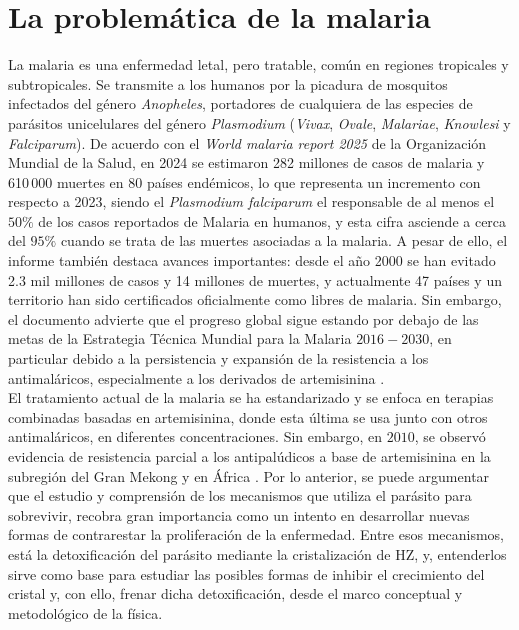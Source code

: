 \documentclass[12pt,letterpaper,oneside]{report}
\begin{document}
\chapter{La problemática de la malaria}

La malaria es una enfermedad letal, pero tratable, común en regiones tropicales y subtropicales. Se transmite a los humanos por la picadura de mosquitos infectados del género \textit{Anopheles}, portadores de cualquiera de las especies de parásitos unicelulares del género \textit{Plasmodium} (\textit{Vivax}, \textit{Ovale}, \textit{Malariae}, \textit{Knowlesi} y \textit{Falciparum}). De acuerdo con el \textit{World malaria report 2025} de la Organización Mundial de la Salud, en 2024 se estimaron 282 millones de casos de malaria y 610\,000 muertes en 80 países endémicos, lo que representa un incremento con respecto a 2023, siendo el \textit{Plasmodium falciparum} el responsable de al menos el $50 \%$ de los casos reportados de Malaria en humanos, y esta cifra asciende a cerca del $95 \%$ cuando se trata de las muertes asociadas a la malaria. A pesar de ello, el informe también destaca avances importantes: desde el año 2000 se han evitado 2.3 mil millones de casos y 14 millones de muertes, y actualmente 47 países y un territorio han sido certificados oficialmente como libres de malaria. Sin embargo, el documento advierte que el progreso global sigue estando por debajo de las metas de la Estrategia Técnica Mundial para la Malaria $2016-2030$, en particular debido a la persistencia y expansión de la resistencia a los antimaláricos, especialmente a los derivados de artemisinina \cite{WHO2025WMR}.\\

El tratamiento actual de la malaria se ha estandarizado y se enfoca en terapias combinadas basadas en artemisinina, donde esta última se usa junto con otros antimaláricos, en diferentes concentraciones. Sin embargo, en $2010$, se observó evidencia de resistencia parcial a los antipalúdicos a base de artemisinina en la subregión del Gran Mekong y en África \cite{WHO2025ArtemisininResistance}. Por lo anterior, se puede argumentar que el estudio y comprensión de los mecanismos que utiliza el parásito para sobrevivir, recobra gran importancia como un intento en desarrollar nuevas formas de contrarestar la proliferación de la enfermedad. Entre esos mecanismos, está la detoxificación del parásito mediante la cristalización de HZ, y, entenderlos sirve como base para estudiar las posibles formas de inhibir el crecimiento del cristal y, con ello, frenar dicha detoxificación, desde el marco conceptual y metodológico de la física.\\
\end{document}
